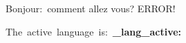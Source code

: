\documentclass{article}
\begin{document}
\begin{listing-tex}
  {
    \textfrench{
      Bonjour:~comment allez vous?
    }
  }
  { ERROR! }
  
  \ExplSyntaxOn    
  The~active~language~is:~\textbf{\erw_lang_active:}
  \ExplSyntaxOff
\end{listing-tex}
\end{document}
